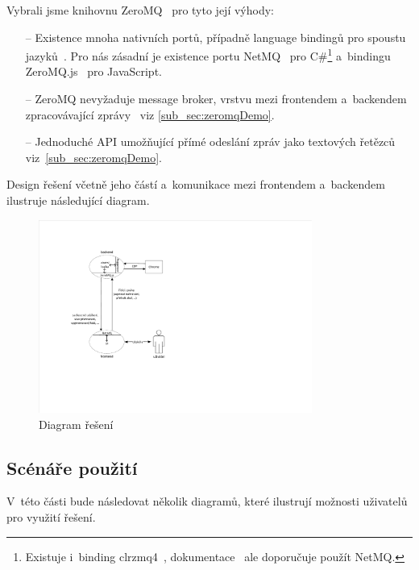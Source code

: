 \documentclass[12pt, a4paper, twoside]{article}
\begin{document}
	Vybrali jsme knihovnu ZeroMQ~\cite{zeromq} pro tyto její výhody:
	\begin{itemize}
		\item[--] Existence mnoha nativních portů, případně language bindingů pro spoustu jazyků~\cite{zeromqDocs}. Pro nás zásadní je existence portu NetMQ~\cite{netmqGithub} pro C\#\footnote{Existuje i~binding clrzmq4~\cite{crlzmq4}, dokumentace~\cite{zeromqCSharp} ale doporučuje použít NetMQ.} a~bindingu ZeroMQ.js~\cite{zeromqJs} pro JavaScript.
		\item[--] ZeroMQ nevyžaduje message broker, vrstvu mezi frontendem a~backendem zpracovávající zprávy~\cite{messageBroker} viz \ref{sub_sec:zeromqDemo}.
		\item[--] Jednoduché API umožňující přímé odeslání zpráv jako textových řetězců viz~\ref{sub_sec:zeromqDemo}.
	\end{itemize}
	Design řešení včetně jeho částí a~komunikace mezi frontendem a~backendem ilustruje následující diagram.
	\nopagebreak
	\begin{figure}[H]
		\centering
		\includegraphics[width=0.8\textwidth]{design.pdf}
		\caption{Diagram řešení}
	\end{figure}
	\newpage
	\subsection{Scénáře použití}
	V~této části bude následovat několik diagramů, které ilustrují možnosti uživatelů pro využití řešení.
\end{document}
